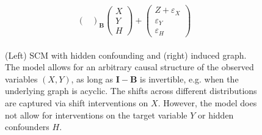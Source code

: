 \begin{example}
\begin{figure}[h!]
\begin{subfigure}{.55\textwidth}
\begin{align}
\begin{split}
{\begin{pmatrix}
    \end{pmatrix}
    }_{
    \mathbf{B}
    }
    \begin{pmatrix}
        X\\
        Y\\
        H
    \end{pmatrix}
    +
    \begin{pmatrix}
        Z + \varepsilon_X\\
        \varepsilon_Y\\
        \varepsilon_H    
    \end{pmatrix}
\end{split}
\end{align}
\end{subfigure}
\begin{subfigure}{.45\textwidth}
  \centering
\end{subfigure}%
\caption{\small{(Left) SCM with hidden confounding and (right) induced graph. The model allows for an arbitrary causal structure of the observed variables $(X,Y)$, as long as $\mathbf{I} - \mathbf{B}$ is invertible, e.g. when the underlying graph is acyclic. The shifts across different distributions are captured via shift interventions on $X$. However, the model does not allow for interventions on the target variable $Y$ or hidden confounders $H$.}}
\label{fig:ex-scm}
\end{figure}
\end{example}
